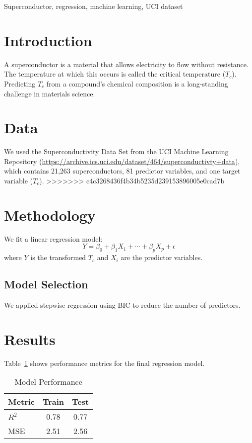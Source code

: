 \documentclass[conference]{IEEEtran}
\begin{document}
\begin{IEEEkeywords}
Superconductor, regression, machine learning, UCI dataset
\end{IEEEkeywords}

\section{Introduction}
A superconductor is a material that allows electricity to flow without resistance. 
The temperature at which this occurs is called the critical temperature ($T_c$).
Predicting $T_c$ from a compound’s chemical composition is a long-standing challenge in materials science.

\section{Data}
We used the Superconductivity Data Set from the UCI Machine Learning Repository 
(\url{https://archive.ics.uci.edu/dataset/464/superconductivty+data}), 
which contains 21,263 superconductors, 81 predictor variables, and one target variable ($T_c$).
>>>>>>> c4c3268436f4b34b5235d239153896005e0cad7b

\section{Methodology}
We fit a linear regression model:
\begin{equation}
Y = \beta_0 + \beta_1X_1 + \cdots + \beta_pX_p + \epsilon
\end{equation}
where $Y$ is the transformed $T_c$ and $X_i$ are the predictor variables.

\subsection{Model Selection}
We applied stepwise regression using BIC to reduce the number of predictors.

\section{Results}
Table~\ref{tab:results} shows performance metrics for the final regression model.

\begin{table}[htbp]
  \caption{Model Performance}
  \centering
  \begin{tabular}{lcc}
    \toprule
    Metric & Train & Test \\
    \midrule
    $R^2$       & 0.78 & 0.77 \\
    MSE         & 2.51 & 2.56 \\
    \bottomrule
  \end{tabular}
  \label{tab:results}
\end{table}
\end{document}

